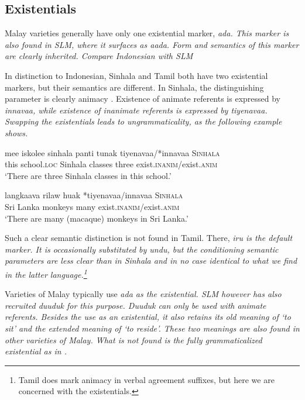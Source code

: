 \documentclass[a4paper,10pt]{article}
\begin{document}
\subsection{Existentials}
Malay varieties generally have only one existential marker, \em ada\em. This marker is also found in SLM, where it surfaces as \em aada\em. Form and semantics of this marker are clearly inherited. Compare Indonesian  with SLM 

In distinction to Indonesian, Sinhala and Tamil both have two existential markers, but their semantics are different. In Sinhala, the distinguishing parameter is clearly animacy \citep[12]{Karunatillake2004}. Existence of animate referents is expressed by \em innavaa\em, while existence of inanimate referents is expressed by \em tiyenavaa\em. Swapping the existentials leads to ungrammaticality, as the following example shows.

\ea
\ea
\gll mee iskolee sinhala panti tunak  tiyenavaa/*innavaa   \textsc{Sinhala} \\
     this school.\textsc{loc} Sinhala classes three exist.\textsc{inanim}/exist.\textsc{anim} \\
`There are three Sinhala classes in this school.'
\ex

\gll langkaava rilaw hu\ung ak  *tiyenavaa/innavaa   \textsc{Sinhala} \\
     Sri{ }Lanka monkeys many exist.\textsc{inanim}/exist.\textsc{anim} \\
`There are many (macaque) monkeys in Sri Lanka.' \citep[790]{Gair2003}
\z
\z

Such a clear semantic distinction is not found in Tamil. There, \em iru \em is the default marker. It is occasionally substituted by \em undu\em, but the conditioning semantic parameters are less clear than in Sinhala and in no case identical to what we find in the latter language.\footnote{Tamil 
 does mark animacy in verbal agreement suffixes, but here we are concerned with the existentials.
}

Varieties of Malay typically use \em ada \em as the existential. SLM however has also recruited \em duuduk \em for this purpose. \em Duuduk \em can only be used with animate referents. Besides the use as an existential, it also retains its old meaning of `to sit' and the extended meaning of `to reside'. These two meanings are also  found in other varieties of Malay. What is not found is the fully grammaticalized existential as in .
 
\end{document}
